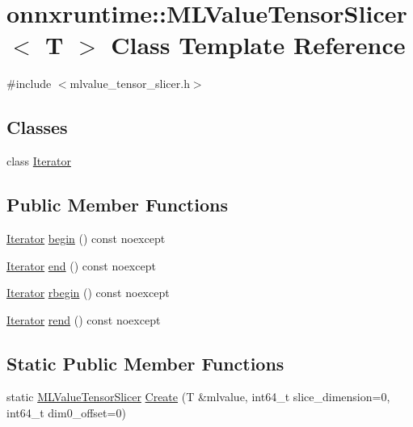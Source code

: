 \hypertarget{classonnxruntime_1_1MLValueTensorSlicer}{}\section{onnxruntime\+:\+:M\+L\+Value\+Tensor\+Slicer$<$ T $>$ Class Template Reference}
\label{classonnxruntime_1_1MLValueTensorSlicer}


{\ttfamily \#include $<$mlvalue\+\_\+tensor\+\_\+slicer.\+h$>$}

\subsection*{Classes}
\begin{DoxyCompactItemize}
\item 
class \mbox{\hyperlink{classonnxruntime_1_1MLValueTensorSlicer_1_1Iterator}{Iterator}}
\end{DoxyCompactItemize}
\subsection*{Public Member Functions}
\begin{DoxyCompactItemize}
\item 
\mbox{\hyperlink{classonnxruntime_1_1MLValueTensorSlicer_1_1Iterator}{Iterator}} \mbox{\hyperlink{classonnxruntime_1_1MLValueTensorSlicer_a61d4d62904415b8ed0b12516f396b2d1}{begin}} () const noexcept
\item 
\mbox{\hyperlink{classonnxruntime_1_1MLValueTensorSlicer_1_1Iterator}{Iterator}} \mbox{\hyperlink{classonnxruntime_1_1MLValueTensorSlicer_a708fbd080203261cda938c0f260fd099}{end}} () const noexcept
\item 
\mbox{\hyperlink{classonnxruntime_1_1MLValueTensorSlicer_1_1Iterator}{Iterator}} \mbox{\hyperlink{classonnxruntime_1_1MLValueTensorSlicer_ac20f401c1a705f484b8733c10eaf23ff}{rbegin}} () const noexcept
\item 
\mbox{\hyperlink{classonnxruntime_1_1MLValueTensorSlicer_1_1Iterator}{Iterator}} \mbox{\hyperlink{classonnxruntime_1_1MLValueTensorSlicer_a83c331a5f9c9ba240a074e8e86919ff0}{rend}} () const noexcept
\end{DoxyCompactItemize}
\subsection*{Static Public Member Functions}
\begin{DoxyCompactItemize}
\item 
static \mbox{\hyperlink{classonnxruntime_1_1MLValueTensorSlicer}{M\+L\+Value\+Tensor\+Slicer}} \mbox{\hyperlink{classonnxruntime_1_1MLValueTensorSlicer_ac99401612f9fd60873bc56b84bc003c6}{Create}} (T \&mlvalue, int64\+\_\+t slice\+\_\+dimension=0, int64\+\_\+t dim0\+\_\+offset=0)
\end{DoxyCompactItemize}


